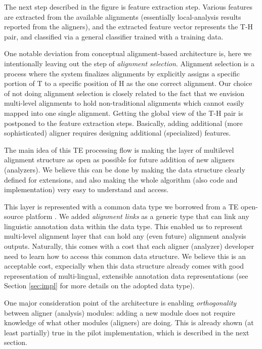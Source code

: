 \documentclass[11pt,letterpaper]{article}
\begin{document}
The next step described in the figure is feature extraction step.
Various features are extracted from the available alignments
(essentially local-analysis results reported from the aligners), and 
the extracted feature vector represents the T-H pair, and classified
via a general classifier trained with a training data. 

One notable deviation from conceptual alignment-based architecture is,
here we intentionally leaving out the step of {\em alignment
selection}. Alignment selection is a process where the system
finalizes alignments by explicitly assigns a specific portion of T to  
a specific position of H as the one correct alignment. Our choice of
not doing alignment selection is closely related to the fact that we
envision multi-level alignments to hold non-traditional alignments
which cannot easily mapped into one single alignment. Getting the
global view of the T-H pair is postponed to the feature extraction
steps. Basically, adding additional (more sophisticated) aligner
requires designing additional (specialized) features.  

The main idea of this TE processing flow is making the layer of
multilevel alignment structure as open as possible for future 
addition of new aligners (analyzers). We believe this can be done by
making the data structure clearly defined for extensions, and also
making the whole algorithm (also code and implementation) very easy to 
understand and access.

This layer is represented with a common data type we borrowed from a
TE open-source platform \cite{}. We added {\em alignment links} as a
generic type that can link any linguistic annotation data within the
data type. This enabled us to represent multi-level alignment layer
that can hold any (even future) alignment analysis outputs.  
Naturally, this comes with a cost that each aligner (analyzer)
developer need to learn how to access this common data structure.
We believe this is an acceptable cost, expecially when this data
structure already comes with good representation of multi-lingual,
extensible annotation data representations (see Section
\ref{sec:impl} for more details on the adopted data type).

One major consideration point of the architecture is enabling {\em
  orthogonality} \cite{} between aligner (analysis) modules: adding a
new module does not require knowledge of what other modules (aligners)
are doing. This is already shown (at least partially) true in the
pilot implementation, which is described in the next section. 
\end{document}
